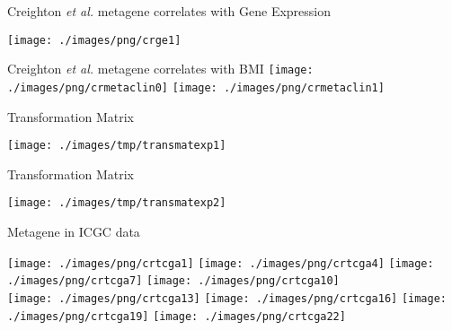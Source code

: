 \documentclass[handout]{beamer}
\begin{document}
\begin{frame}{\normalsize Creighton \textit{et al.} metagene correlates with Gene Expression}
	\begin{center}
		\texttt{[image: ./images/png/crge1]}
	\end{center}
\end{frame}

\begin{frame}{Creighton \textit{et al.} metagene correlates with BMI}
	\hspace{-4.0ex}
	\texttt{[image: ./images/png/crmetaclin0]}
	\texttt{[image: ./images/png/crmetaclin1]}
\end{frame}


\begin{frame}{Transformation Matrix}
	\begin{center}
		\texttt{[image: ./images/tmp/transmatexp1]}
	\end{center}
\end{frame}

\begin{frame}{Transformation Matrix}
	\begin{center}
		\texttt{[image: ./images/tmp/transmatexp2]}
	\end{center}
\end{frame}

\begin{frame}{Metagene in ICGC data}
	\begin{adjustwidth}{-1.5em}{-1.5em}
		\texttt{[image: ./images/png/crtcga1]}
		\texttt{[image: ./images/png/crtcga4]}
		\texttt{[image: ./images/png/crtcga7]}
		\texttt{[image: ./images/png/crtcga10]}\\
		\texttt{[image: ./images/png/crtcga13]}
		\texttt{[image: ./images/png/crtcga16]}
		\texttt{[image: ./images/png/crtcga19]}
		\texttt{[image: ./images/png/crtcga22]}
	\end{adjustwidth}
\end{frame}
\end{document}
